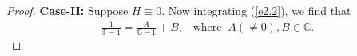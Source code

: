 \documentclass[a4paper,draft]{amsproc}
\theoremstyle{plain}
\theoremstyle{definition}
\theoremstyle{remark}
\newcommand{\be}{\begin{equation}}
\newcommand{\ee}{\end{equation}}
\newcommand{\beas}{\begin{eqnarray*}}
\newcommand{\eeas}{\end{eqnarray*}}
\newcommand{\bea}{\begin{eqnarray}}
\newcommand{\eea}{\end{eqnarray}}
\numberwithin{equation}{section}
\renewcommand{\leq}{\leqslant}\renewcommand{\geq}{\geqslant}
\begin{document}
\begin{proof}

\vspace{0.1in}\par{\bf Case-II:} Suppose	$H\equiv0$. Now integrating (\ref{e2.2}), we find that \bea\nonumber \frac{1}{\mathbb{F}-1}=\frac{A}{\mathbb{G}-1}+B,\;\;\; \mbox{where}\;\; A(\neq0), B\in\mathbb{C}.\eea 
\end{proof}
\end{document}
